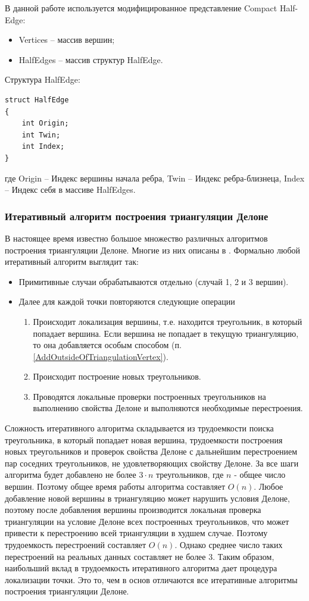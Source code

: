 \documentclass{fefu}
\begin{document}
В данной работе используется модифицированное представление Compact Half-Edge:
\begin{itemize}
    \item Vertices -- массив вершин;
    \item HalfEdges -- массив структур HalfEdge.
\end{itemize}

Структура HalfEdge:
\begin{verbatim}
struct HalfEdge
{
    int Origin;
    int Twin;
    int Index;
}
\end{verbatim}
где Origin -- Индекс вершины начала ребра, Twin -- Индекс ребра-близнеца, Index -- Индекс себя в массиве HalfEdges.
\subsubsection{Итеративный алгоритм построения триангуляции Делоне}
В настоящее время известно большое множество различных алгоритмов построения триангуляции Делоне. Многие из них описаны
в \cite{Skvorcov}. Формально любой итеративный алгоритм выглядит так:
\begin{itemize}
    \item Примитивные случаи обрабатываются отдельно (случай 1, 2 и 3 вершин).
    \item Далее для каждой точки повторяются следующие операции
    \begin{enumerate}
        \item Происходит локализация вершины, т.е. находится треугольник, в который попадает вершина. Если вершина не попадает
        в текущую триангуляцию, то она добавляется особым способом (п. \ref{AddOutsideOfTriangulationVertex}).
        \item Происходит построение новых треугольников.
        \item Проводятся локальные проверки построенных треугольников на выполнению свойства Делоне и выполняются
        необходимые перестроения.
    \end{enumerate}
\end{itemize}
Сложность итеративного алгоритма складывается из трудоемкости поиска треугольника, в который попадает новая вершина,
трудоемкости построения новых треугольников и проверок свойства Делоне с дальнейшим перестроением пар соседних
треугольников, не удовлетворяющих свойству Делоне. За все шаги алгоритма будет добавлено не более $3 \cdot n$
треугольников, где $n$ - общее число вершин. Поэтому общее время работы алгоритма составляет $O(n)$. Любое добавление
новой вершины в триангуляцию может нарушить условия Делоне, поэтому после добавления вершины производится локальная
проверка триангуляции на условие Делоне всех построенных треугольников, что может привести к перестроению всей
триангуляции в худшем случае. Поэтому трудоемкость перестроений составляет $O(n)$. Однако среднее число таких перестроений
на реальных данных составляет не более 3\cite{Skvorcov2}. Таким образом, наибольший вклад в трудоемкость итеративного
алгоритма дает процедура локализации точки. Это то, чем в основ отличаются все итеративные алгоритмы построения
триангуляции Делоне.
\end{document}
